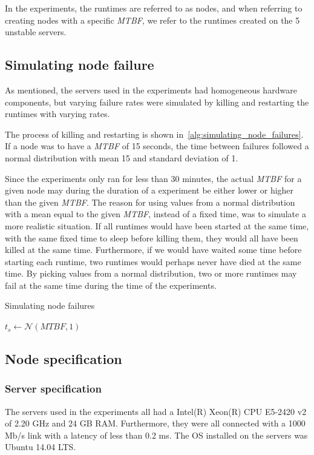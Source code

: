 \documentclass{cslthse-msc}
\begin{document}
In the experiments, the runtimes are referred to as nodes, and when referring to creating nodes with a specific \emph{MTBF}, we refer to the runtimes created on the 5 unstable servers.

\subsection{Simulating node failure} \label{sec:simulating_node_failure}
As mentioned, the servers used in the experiments had homogeneous hardware components, but varying failure rates were simulated by killing and restarting the runtimes with varying rates.

The process of killing and restarting is shown in~\cref{alg:simulating_node_failures}. If a node was to have a \emph{MTBF} of 15 seconds, the time between failures followed a normal distribution with mean 15 and standard deviation of 1. 

Since the experiments only ran for less than 30 minutes, the actual \emph{MTBF} for a given node may during the duration of a experiment be either lower or higher than the given \emph{MTBF}. The reason for using values from a normal distribution with a mean equal to the given \emph{MTBF}, instead of a fixed time, was to simulate a more realistic situation. If all runtimes would have been started at the same time, with the same fixed time to sleep before killing them, they would all have been killed at the same time. Furthermore, if we would have waited some time before starting each runtime, two runtimes would perhaps never have died at the same time. By picking values from a normal distribution, two or more runtimes may fail at the same time during the time of the experiments.

\begin{algorithm} 
	\caption{Simulating node failures} \label{alg:simulating_node_failures}
	\begin{algorithmic}[1]
		\State
		\State $t_{s}\gets \mathcal{N} (MTBF,1)$
		\State
		\State
	\EndWhile
	\end{algorithmic}
\end{algorithm}

\subsection{Node specification}
\subsubsection{Server specification} \label{sec:server_spec}
The servers used in the experiments all had a Intel(R) Xeon(R) CPU E5-2420 v2 of 2.20 GHz and 24 GB RAM. Furthermore, they were all connected with a 1000 Mb/s link with a latency of less than 0.2 ms. The OS installed on the servers was Ubuntu 14.04 LTS.
\end{document}
